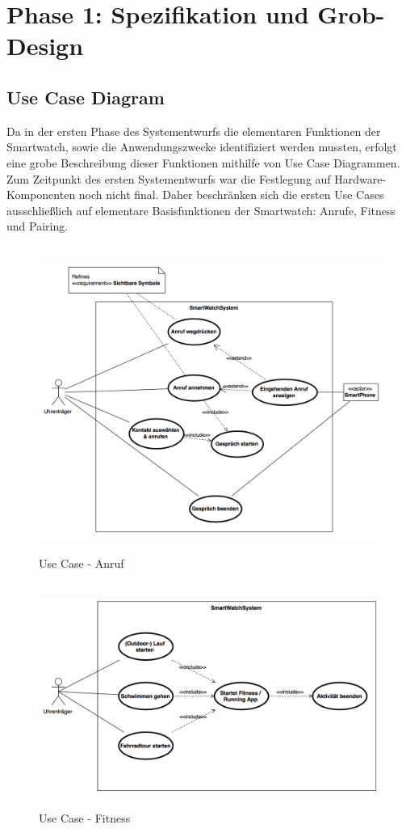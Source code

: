 \chapter{Phase 1: Spezifikation und Grob-Design}

\section{Use Case Diagram}
\label{sec:use_cases}
Da in der ersten Phase des Systementwurfs die elementaren Funktionen der Smartwatch, sowie die Anwendungszwecke identifiziert werden mussten, erfolgt eine grobe Beschreibung dieser Funktionen mithilfe von Use Case Diagrammen. Zum Zeitpunkt des ersten Systementwurfs war die Festlegung auf Hardware-Komponenten noch nicht final. Daher beschränken sich die ersten Use Cases ausschließlich auf elementare Basisfunktionen der Smartwatch: Anrufe, Fitness und Pairing.


\begin{figure}[H]
\centering\
\includegraphics[width=14cm]{img/usecase-anruf-p1}
\caption{Use Case - Anruf}\label{fig:usecase-anruf-p1}
\end{figure}

\begin{figure}[H]
\centering\
\includegraphics[width=14cm]{img/usecase-fitness-p1}
\caption{Use Case - Fitness}\label{fig:usecase-fitness-p1}
\end{figure}

